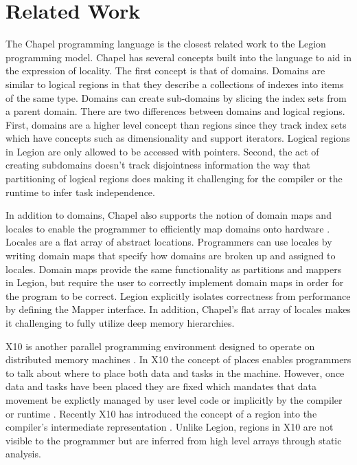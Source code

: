 
\section{Related Work}

The Chapel programming language \cite{Chamberlain:Chapel} is the closest related work to the Legion
programming model.  Chapel has several concepts built into the language to aid in
the expression of locality.  The first concept is that of domains.  Domains
are similar to logical regions in that they describe a collections of indexes
into items of the same type.  Domains can create sub-domains by slicing the index sets from
a parent domain.  There are two differences between domains and logical regions.
First, domains are a higher level concept than regions since they track index sets which
have concepts such as dimensionality and support iterators.  Logical regions in Legion 
are only allowed to be accessed with pointers.  Second, the act of creating
subdomains doesn't track disjointness information the way that partitioning of logical regions
does making it challenging for the compiler or the runtime to infer task independence.

In addition to domains, Chapel also supports the notion of domain maps and locales to enable 
the programmer to efficiently map domains onto hardware \cite{CHAPEL11}.  Locales are a flat array
of abstract locations.  Programmers can use locales by writing domain maps that specify
how domains are broken up and assigned to locales.  Domain maps provide the same functionality
as partitions and mappers in Legion, but require the user to correctly implement domain
maps in order for the program to be correct.  Legion explicitly isolates correctness
from performance by defining the Mapper interface.  In addition, Chapel's flat array of locales
makes it challenging to fully utilize deep memory hierarchies.

X10 is another parallel programming environment designed to operate on distributed
memory machines \cite{X1005}.  In X10 the concept of places enables programmers to talk about where
to place both data and tasks in the machine.  However, once data and tasks have
been placed they are fixed which mandates that data movement be explictly managed by
user level code or implicitly by the compiler or runtime \cite{X1008}.  Recently X10 has introduced
the concept of a region into the compiler's intermediate representation \cite{X1011}.
Unlike Legion, regions in X10 are not visible to the programmer but are inferred
from high level arrays through static analysis.

